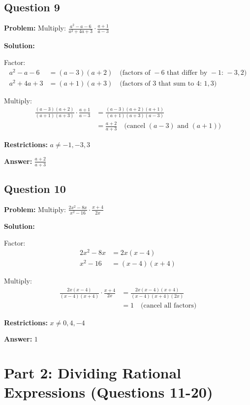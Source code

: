 \documentclass[12pt]{article}
\begin{document}
\subsection*{Question 9}
\textbf{Problem:} Multiply: $\frac{a^2-a-6}{a^2+4a+3} \cdot \frac{a+1}{a-3}$

\textbf{Solution:}

Factor:
\begin{align*}
a^2 - a - 6 &= (a-3)(a+2) \quad \text{(factors of } -6 \text{ that differ by } -1 \text{: } -3, 2 \text{)} \\
a^2 + 4a + 3 &= (a+1)(a+3) \quad \text{(factors of } 3 \text{ that sum to } 4 \text{: } 1, 3 \text{)}
\end{align*}

Multiply:
\begin{align*}
\frac{(a-3)(a+2)}{(a+1)(a+3)} \cdot \frac{a+1}{a-3} &= \frac{(a-3)(a+2)(a+1)}{(a+1)(a+3)(a-3)} \\
&= \frac{a+2}{a+3} \quad \text{(cancel } (a-3) \text{ and } (a+1) \text{)}
\end{align*}

\textbf{Restrictions:} $a \neq -1, -3, 3$

\textbf{Answer:} $\boxed{\frac{a+2}{a+3}}$

\subsection*{Question 10}
\textbf{Problem:} Multiply: $\frac{2x^2-8x}{x^2-16} \cdot \frac{x+4}{2x}$

\textbf{Solution:}

Factor:
\begin{align*}
2x^2 - 8x &= 2x(x-4) \\
x^2 - 16 &= (x-4)(x+4)
\end{align*}

Multiply:
\begin{align*}
\frac{2x(x-4)}{(x-4)(x+4)} \cdot \frac{x+4}{2x} &= \frac{2x(x-4)(x+4)}{(x-4)(x+4)(2x)} \\
&= 1 \quad \text{(cancel all factors)}
\end{align*}

\textbf{Restrictions:} $x \neq 0, 4, -4$

\textbf{Answer:} $\boxed{1}$

\newpage

\section*{Part 2: Dividing Rational Expressions (Questions 11-20)}
\end{document}
